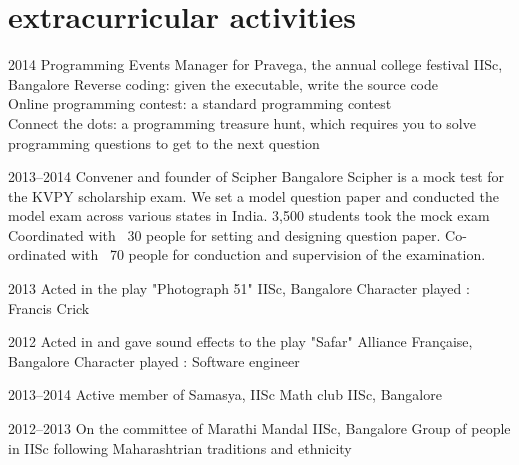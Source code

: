 \documentclass[11pt]{friggeri-cv}%
\begin{document}
\section{extracurricular activities}

\begin{entrylist}
  \entryy
    {2014}
    {Programming Events Manager for Pravega, the annual college festival}
    {IISc, Bangalore}
    {Reverse coding: given the executable, write the source code \\ Online programming contest: a standard programming contest\\ Connect the dots: a programming treasure hunt, which requires you to solve programming questions to get to the next question}
\end{entrylist}
\begin{entrylist}
  \entryy
    {2013--2014}
    {Convener and founder of Scipher}
    {Bangalore}
    {Scipher is a mock test for the KVPY scholarship exam. We set a model question paper and conducted the model exam across various states in India. 3,500 students took the mock exam Coordinated with ~30 people for setting and designing question paper. Co-ordinated with ~70 people for conduction and supervision of the examination. }
\end{entrylist}
\begin{entrylist}
  \entryy
    {2013}
    {Acted in the play "Photograph 51"}
    {IISc, Bangalore}
    {Character played : Francis Crick}
\end{entrylist}
\begin{entrylist}
  \entryy
    {2012}
    {Acted in and gave sound effects to the play "Safar"}
    {Alliance Française, Bangalore}
    {Character played : Software engineer}
\end{entrylist}
\begin{entrylist}
  \entryyy
    {2013--2014}
    {Active member of Samasya, IISc Math club}
    {IISc, Bangalore}
\end{entrylist}
\begin{entrylist}
  \entryy
    {2012--2013}
    {On the committee of Marathi Mandal}
    {IISc, Bangalore}
    {Group of people in IISc following Maharashtrian traditions and ethnicity}
\end{entrylist}
\end{document}
